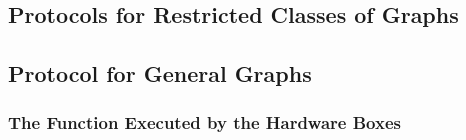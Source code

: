 \subsection{Protocols for Restricted Classes of Graphs}\label{sec:prcg}

%
%

\subsection{Protocol for General Graphs}\label{section:protGen}

\subsubsection{The Function Executed by the Hardware Boxes}\label{app-06-hw-function}


